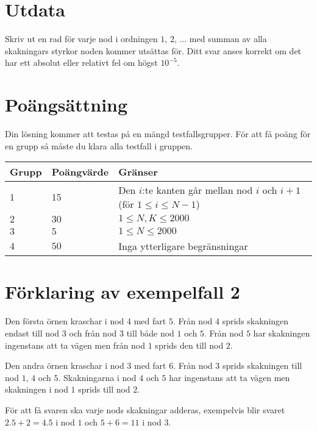 \section*{Utdata}
Skriv ut en rad för varje nod i ordningen $1$, $2$, $\dots$ med summan av alla skakningars styrkor noden kommer utsättas för.
Ditt svar anses korrekt om det har ett absolut eller relativt fel om högst $10^{-5}$.

\section*{Poängsättning}
Din lösning kommer att testas på en mängd testfallsgrupper.
För att få poäng för en grupp så måste du klara alla testfall i gruppen.

\noindent
\begin{tabular}{| l | l | l |}
  \hline
  Grupp & Poängvärde & Gränser \\ \hline
  $1$    & $15$       &  Den $i$:te kanten går mellan nod $i$ och $i+1$ (för $1 \le i \le N-1$) \\ \hline 
  $2$    & $30$       &  $1 \le N,K \le 2000$ \\ \hline
  $3$    & $5$        &  $1 \le N \le 2000$ \\ \hline
  $4$    & $50$       &  Inga ytterligare begränsningar \\ \hline
\end{tabular}

\section*{Förklaring av exempelfall 2}
Den första örnen kraschar i nod $4$ med fart $5$.
Från nod $4$ sprids skakningen endast till nod $3$ och från nod $3$ till både nod $1$ och $5$.
Från nod $5$ har skakningen ingenstans att ta vägen men från nod $1$ sprids den till nod $2$.

Den andra örnen kraschar i nod $3$ med fart $6$.
Från nod $3$ sprids skakningen till nod $1$, $4$ och $5$.
Skakningarna i nod $4$ och $5$ har ingenstans att ta vägen men skakningen i nod $1$ sprids till nod $2$.

För att få svaren ska varje nods skakningar adderas, exempelvis blir svaret $2.5+2=4.5$ i nod $1$ och $5+6=11$ i nod $3$.
